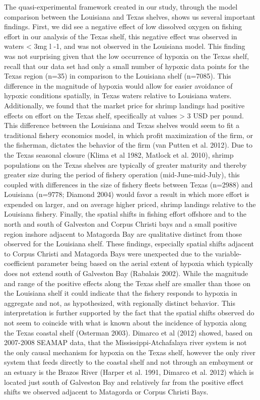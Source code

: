 \documentclass[10pt]{article}
\begin{document}
The quasi-experimental framework created in our study, through the model comparison between the Louisiana and Texas shelves, shows us several important findings.  First, we did see a negative effect of low dissolved oxygen on fishing effort in our analysis of the Texas shelf, this negative effect was observed in waters < 3mg l -1, and was not observed in the Louisiana model.  This finding was not surprising given that the low occurrence of hypoxia on the Texas shelf, recall that our data set had only a small number of hypoxic data points for the Texas region (n=35) in comparison to the Louisiana shelf (n=7085).  This difference in the magnitude of hypoxia would allow for easier avoidance of hypoxic conditions spatially, in Texas waters relative to Louisiana waters.  Additionally, we found that the market price for shrimp landings had positive effects on effort on the Texas shelf, specifically at values > 3 USD per pound.  This difference between the Louisiana and Texas shelves would seem to fit a traditional fishery economics model, in which profit maximization of the firm, or the fisherman, dictates the behavior of the firm (van Putten et al. 2012).  Due to the Texas seasonal closure (Klima et al 1982, Matlock et al. 2010), shrimp populations on the Texas shelves are typically of greater maturity and thereby greater size during the period of fishery operation (mid-June-mid-July), this coupled with differences in the size of fishery fleets between Texas (n=2988) and Louisiana (n=9778; Diamond 2004) would favor a result in which more effort is expended on larger, and on average higher priced, shrimp landings relative to the Louisiana fishery.  Finally, the spatial shifts in fishing effort offshore and to the north and south of Galveston and Corpus Christi bays and a small positive region inshore adjacent to Matagorda Bay are qualitative distinct from those observed for the Louisiana shelf.  These findings, especially spatial shifts adjacent to Corpus Christi and Matagorda Bays were unexpected due to the variable-coefficient parameter being based on the aerial extent of hypoxia which typically does not extend south of Galveston Bay (Rabalais 2002).  While the magnitude and range of the positive effects along the Texas shelf are smaller than those on the Louisiana shelf it could indicate that the fishery responds to hypoxia in aggregate and not, as hypothesized, with regionally distinct behavior.  This interpretation is further supported by the fact that the spatial shifts observed do not seem to coincide with what is known about the incidence of hypoxia along the Texas coastal shelf (Osterman 2003).  Dimarco et al (2012) showed, based on 2007-2008 SEAMAP data, that the Mississippi-Atchafalaya river system is not the only causal mechanism for hypoxia on the Texas shelf, however the only river system that feeds directly to the coastal shelf and not through an embayment or an estuary is the Brazos River (Harper et al. 1991, Dimarco et al. 2012) which is located just south of Galveston Bay and relatively far from the positive effect shifts we observed adjacent to Matagorda or Corpus Christi Bays.  
\end{document}
